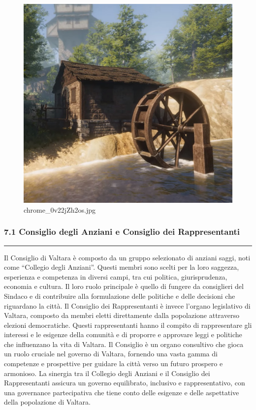 \begin{figure}
\centering
\includegraphics{chrome_0v22jZh2os.jpg}
\caption{chrome\_0v22jZh2os.jpg}
\end{figure}

\subsubsection{7.1 Consiglio degli Anziani e Consiglio dei
Rappresentanti}\label{consiglio-degli-anziani-e-consiglio-dei-rappresentanti}

\begin{center}\rule{0.5\linewidth}{0.5pt}\end{center}

Il Consiglio di Valtara è composto da un gruppo selezionato di anziani
saggi, noti come ``Collegio degli Anziani''. Questi membri sono scelti
per la loro saggezza, esperienza e competenza in diversi campi, tra cui
politica, giurisprudenza, economia e cultura. Il loro ruolo principale è
quello di fungere da consiglieri del Sindaco e di contribuire alla
formulazione delle politiche e delle decisioni che riguardano la città.
Il Consiglio dei Rappresentanti è invece l'organo legislativo di
Valtara, composto da membri eletti direttamente dalla popolazione
attraverso elezioni democratiche. Questi rappresentanti hanno il compito
di rappresentare gli interessi e le esigenze della comunità e di
proporre e approvare leggi e politiche che influenzano la vita di
Valtara. Il Consiglio è un organo consultivo che gioca un ruolo cruciale
nel governo di Valtara, fornendo una vasta gamma di competenze e
prospettive per guidare la città verso un futuro prospero e armonioso.
La sinergia tra il Collegio degli Anziani e il Consiglio dei
Rappresentanti assicura un governo equilibrato, inclusivo e
rappresentativo, con una governance partecipativa che tiene conto delle
esigenze e delle aspettative della popolazione di Valtara.

